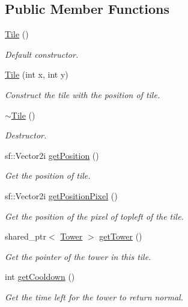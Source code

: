 \subsection*{Public Member Functions}
\begin{DoxyCompactItemize}
\item 
\hyperlink{class_tile_aeeb5593bb6b75aae2edfcccbc84ab378}{Tile} ()
\begin{DoxyCompactList}\small\item\em Default constructor. \end{DoxyCompactList}\item 
\hyperlink{class_tile_a837f442dc4576cd22c95fab3bd29dc69}{Tile} (int x, int y)
\begin{DoxyCompactList}\small\item\em Construct the tile with the position of tile. \end{DoxyCompactList}\item 
\hyperlink{class_tile_a98634abbd93fa13d0578d7103202d03d}{$\sim$\+Tile} ()
\begin{DoxyCompactList}\small\item\em Destructor. \end{DoxyCompactList}\item 
sf\+::\+Vector2i \hyperlink{class_tile_ad66322fd7d2cb15d9387a567662c0260}{get\+Position} ()
\begin{DoxyCompactList}\small\item\em Get the position of tile. \end{DoxyCompactList}\item 
sf\+::\+Vector2i \hyperlink{class_tile_adf9367fb8cb9d26f51d692f18ef2d4d3}{get\+Position\+Pixel} ()
\begin{DoxyCompactList}\small\item\em Get the position of the pixel of topleft of the tile. \end{DoxyCompactList}\item 
shared\+\_\+ptr$<$ \hyperlink{class_tower}{Tower} $>$ \hyperlink{class_tile_a741c73bfdb1607240e99f54a6c29153f}{get\+Tower} ()
\begin{DoxyCompactList}\small\item\em Get the pointer of the tower in this tile. \end{DoxyCompactList}\item 
int \hyperlink{class_tile_a49a65d5fb6a4607d21966c82c3198bfb}{get\+Cooldown} ()
\begin{DoxyCompactList}\small\item\em Get the time left for the tower to return normal. \end{DoxyCompactList}\item 

\end{DoxyCompactItemize}
